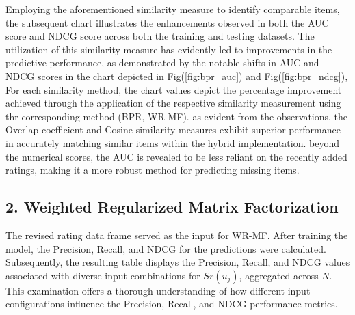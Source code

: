 \documentclass[journal]{IEEEtran}
\begin{document}
Employing the aforementioned similarity measure to identify comparable items, the subsequent chart illustrates the enhancements 
observed in both the AUC score and NDCG score across both the training and testing datasets. The utilization of this similarity 
measure has evidently led to improvements in the predictive performance, as demonstrated by the notable shifts in AUC and NDCG 
scores in the chart depicted in Fig(\ref{fig:bpr_auc}) and Fig(\ref{fig:bpr_ndcg}), For each similarity method, the chart values depict the percentage improvement achieved through the application of the respective 
similarity measurement using thr corresponding method (BPR, WR-MF). as evident from the observations, the Overlap 
coefficient and Cosine similarity measures exhibit superior performance in accurately matching similar items within the hybrid 
implementation. beyond the numerical scores, the AUC is revealed to be less reliant on the recently added ratings, making it a 
more robust method for predicting missing items.

\subsection*{2. Weighted Regularized Matrix Factorization}
The revised rating data frame served as the input for WR-MF. After training the model, the Precision, Recall, and NDCG for the 
predictions were calculated. Subsequently, the resulting table displays the Precision, Recall, and NDCG values associated with 
diverse input combinations for \(Sr(u_j)\), aggregated across \(N\). This examination offers a thorough understanding of how 
different input configurations influence the Precision, Recall, and NDCG performance metrics.
\end{document}
